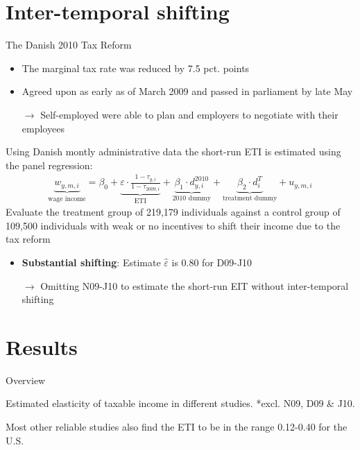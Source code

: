 \documentclass[8pt]{beamer}
\begin{document}
\section{Inter-temporal shifting}


\begin{frame}{\citet{kreiner2016tax}}
  The Danish 2010 Tax Reform
  \begin{itemize}
    \item The marginal tax rate was reduced by 7.5 pct. points
    \item Agreed upon as early as  of March 2009 and passed in parliament by late May
    \item[$\rightarrow$] Self-employed were able to plan and employers to negotiate with their employees
  \end{itemize}
  Using Danish montly administrative data the short-run ETI is estimated using the panel regression: \begin{align}
    \underbrace{w_{y,m,i}}_\text{wage income} = \beta_0 + \underbrace{\varepsilon\cdot\frac{1-\tau_{y,i}}{1-\tau_{2009,i}}}_\text{ETI} + \underbrace{\beta_1\cdot d_{y,i}^{2010}}_\text{2010 dummy} + \underbrace{\beta_2\cdot d_i^T}_\text{treatment dummy} + u_{y,m,i}
    \label{eq:wage}
  \end{align}
  Evaluate the treatment group of 219,179 individuals against a control group of 109,500 individuals with weak or no incentives to shift their income due to the tax reform
  \begin{itemize}
    \item \textbf{Substantial shifting}: Estimate $\hat{\varepsilon}$ is 0.80 for D09-J10
    \item[$\rightarrow$] Omitting N09-J10 to estimate the short-run EIT without inter-temporal shifting
  \end{itemize}
\end{frame}


\section{Results}


\begin{frame}{Overview}
  \begin{table}
    \centering
    \footnotesize
    
    \caption{Estimated elasticity of taxable income in different studies. *excl. N09, D09 \& J10.}
    \label{tab:elasticities}
  \end{table}
  Most other reliable studies also find the ETI to be in the range 0.12-0.40 for the U.S. \citep{saez2012elasticity}
\end{frame}
\end{document}
